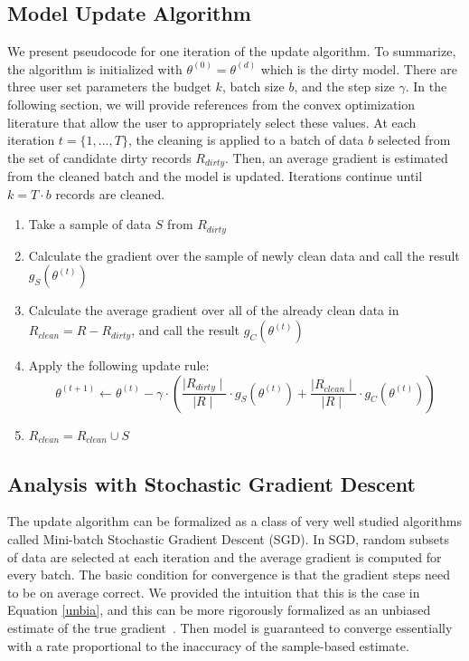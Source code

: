 \subsection{Model Update Algorithm}
We present pseudocode for one iteration of the update algorithm.
To summarize, the algorithm is initialized with $\theta^{(0)} = \theta^{(d)}$ which is the dirty model.
There are three user set parameters the budget $k$, batch size $b$, and the step size $\gamma$.
In the following section, we will provide references from the convex optimization literature that allow the user to appropriately select these values.
At each iteration $t=\{1,...,T\}$, the cleaning is applied to a batch of data $b$ selected from the set of candidate dirty records $R_{dirty}$.
Then, an average gradient is estimated from the cleaned batch and the model is updated.
Iterations continue until $k = T \cdot b$ records are cleaned.

\begin{enumerate}[noitemsep]
	\item Take a sample of data $S$ from $R_{dirty}$ 
	\item Calculate the gradient over the sample of newly clean data and call the result $g_S(\theta^{(t)})$
	\item Calculate the average gradient over all of the already clean data in $R_{clean}=R-R_{dirty}$, and call the result $g_C(\theta^{(t)})$
	\item Apply the following update rule:
	\[
	\theta^{(t+1)} \leftarrow \theta^{(t)} - \gamma \cdot(\frac{\mid R_{dirty} \mid}{\mid R \mid} \cdot g_S(\theta^{(t)}) + \frac{\mid R_{clean} \mid}{\mid R \mid} \cdot  g_C(\theta^{(t)}))
	\]
	\item $R_{clean} = R_{clean} \cup S$ 
\end{enumerate} 

\subsection{Analysis with Stochastic Gradient Descent}\label{sgd}
The update algorithm can be formalized as a class of very well studied algorithms called Mini-batch Stochastic Gradient Descent (SGD).
In SGD, random subsets of data are selected at each iteration and the average gradient is computed for every batch.
The basic condition for convergence is that the gradient steps need to be on average correct.
We provided the intuition that this is the case in Equation \ref{unbia}, and this can be more rigorously formalized as an unbiased estimate of the true gradient~\cite{activecleanarxiv}.
Then model is guaranteed to converge essentially with a rate proportional to the inaccuracy of the sample-based estimate.

